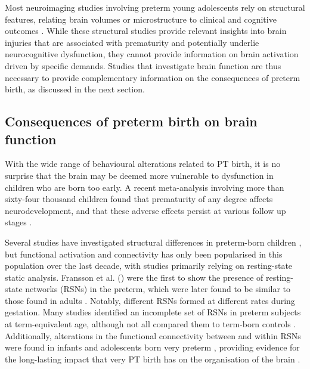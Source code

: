 Most neuroimaging studies involving preterm young adolescents rely on structural features, relating brain volumes or microstructure to clinical and cognitive outcomes \citep{Huning2018, Groeschel2019, Boardman2020}. While these structural studies provide relevant insights into brain injuries that are associated with prematurity and potentially underlie neurocognitive dysfunction, they cannot provide information on brain activation driven by specific demands. Studies that investigate brain function are thus necessary to provide complementary information on the consequences of preterm birth, as discussed in the next section.




\subsection{Consequences of preterm birth on brain function}




With the wide range of behavioural alterations related to PT birth, it is no surprise that the brain may be deemed more vulnerable to dysfunction in children who are born too early. 
A recent meta-analysis involving more than sixty-four thousand children found that prematurity of any degree affects neurodevelopment, and that these adverse effects persist at various follow up stages \citep{Allotey2018}. 



Several studies have investigated structural differences in preterm-born children \citep{Huppi1998b, Brown2014, Kersbergen2014, KostovicSrzentic2019}, but functional activation and connectivity has only been popularised in this population over the last decade, with studies primarily relying on resting-state static analysis. 
Fransson et al. (\citeyear{Fransson2007}) were the first to show the presence of resting-state networks (RSNs) in the preterm, which were later found to be similar to those found in adults \citep{Doria2010}. 
Notably, different RSNs formed at different rates during gestation. Many studies identified an incomplete set of RSNs in preterm subjects at term-equivalent age, although not all compared them to term-born controls \citep{Lin2008, Fransson2007, Fransson2011, Gao2015, Lordier2019}.
Additionally, alterations in the functional connectivity between and within RSNs were found in infants \citep{Gozdas2018} and adolescents \citep{Wehrle2018} born very preterm , providing evidence for the long-lasting impact that very PT birth has on the organisation of the brain \citep{Damaraju2010,White2014,Johns2019}. 

